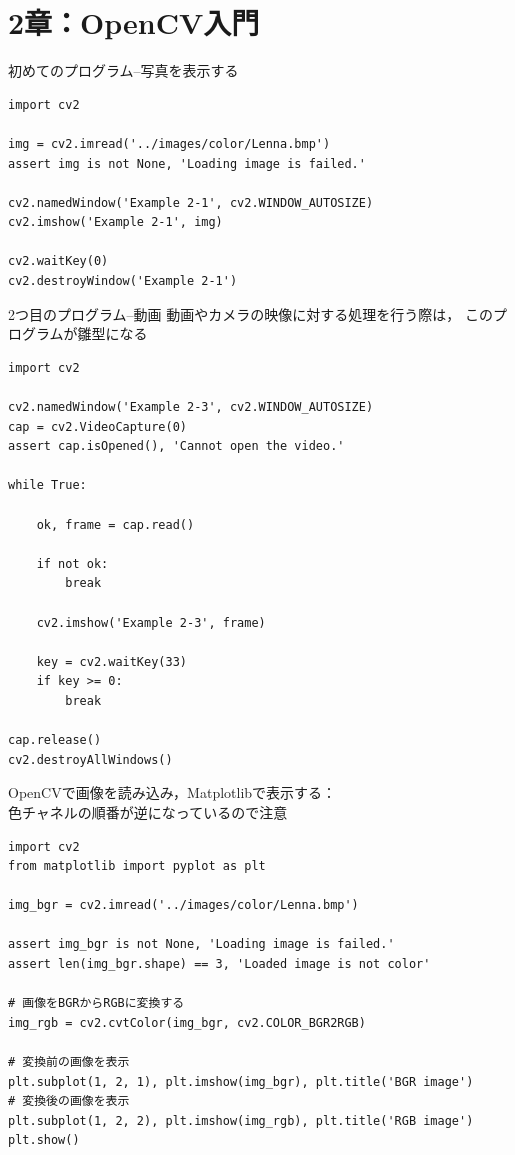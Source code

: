 \documentclass[10pt]{beamer}
\begin{document}
	\section{2章：OpenCV入門}
	
	\begin{frame}[fragile]{初めてのプログラム--写真を表示する}

		\begin{verbatim}
import cv2

img = cv2.imread('../images/color/Lenna.bmp')
assert img is not None, 'Loading image is failed.'

cv2.namedWindow('Example 2-1', cv2.WINDOW_AUTOSIZE)
cv2.imshow('Example 2-1', img)

cv2.waitKey(0)
cv2.destroyWindow('Example 2-1')
		\end{verbatim}
	\end{frame}
	
	\begin{frame}[fragile]{2つ目のプログラム--動画}
		動画やカメラの映像に対する処理を行う際は，
		このプログラムが雛型になる

		\scriptsize
		\begin{verbatim}
import cv2

cv2.namedWindow('Example 2-3', cv2.WINDOW_AUTOSIZE)
cap = cv2.VideoCapture(0)
assert cap.isOpened(), 'Cannot open the video.'

while True:
    
    ok, frame = cap.read()

    if not ok:
        break
    
    cv2.imshow('Example 2-3', frame)
    
    key = cv2.waitKey(33)
    if key >= 0:
        break

cap.release()
cv2.destroyAllWindows()
		\end{verbatim}
	\end{frame}

	\begin{frame}[fragile]{OpenCVで画像を読み込み，Matplotlibで表示する：\\色チャネルの順番が逆になっているので注意}
		\scriptsize
		\begin{verbatim}
import cv2
from matplotlib import pyplot as plt

img_bgr = cv2.imread('../images/color/Lenna.bmp')

assert img_bgr is not None, 'Loading image is failed.'
assert len(img_bgr.shape) == 3, 'Loaded image is not color'

# 画像をBGRからRGBに変換する
img_rgb = cv2.cvtColor(img_bgr, cv2.COLOR_BGR2RGB) 

# 変換前の画像を表示
plt.subplot(1, 2, 1), plt.imshow(img_bgr), plt.title('BGR image')
# 変換後の画像を表示
plt.subplot(1, 2, 2), plt.imshow(img_rgb), plt.title('RGB image')
plt.show()
		\end{verbatim}
	\end{frame}
\end{document}
